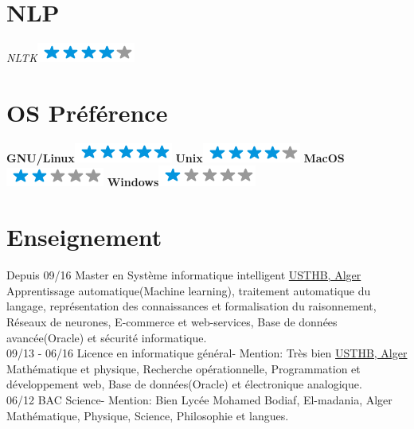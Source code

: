 \documentclass[]{friggeri-cv}
\begin{document}
\begin{aside}
  \section{NLP}
    \emph{NLTK}\includegraphics[scale=0.40]{img/4stars.png}    
    ~
    ~
  \section{OS Préférence}
    \textbf{GNU/Linux}\includegraphics[scale=0.40]{img/5stars.png}
    \textbf{Unix}\includegraphics[scale=0.40]{img/4stars.png}
    \textbf{MacOS}\includegraphics[scale=0.40]{img/2stars.png}
    \textbf{Windows}\includegraphics[scale=0.40]{img/1stars.png}
\end{aside}
\vspace{0.42cm}
\section{Enseignement}
\begin{entrylist}
  \entry
    {Depuis 09/16}
    {Master en  Système informatique intelligent}
    {\href{http://www.usthb.dz/IMG/pdf/Master-SII.pdf}{USTHB, Alger}}
    {Apprentissage automatique(Machine learning), traitement automatique du langage, représentation des connaissances et formalisation du raisonnement, Réseaux de neurones, E-commerce et web-services, Base de données avancée(Oracle) et sécurité informatique.\\}
  \entry
    {09/13 - 06/16}
    {Licence en informatique général- Mention: Très bien}
    {\href{http://www.usthb.dz/spip.php?article47}{USTHB, Alger}}
    {Mathématique et physique, Recherche opérationnelle, Programmation et développement web,  Base de données(Oracle) et électronique analogique.\\}
  \entry
    {06/12}
    {BAC Science- Mention: Bien}
    {Lycée Mohamed Bodiaf, El-madania, Alger}
    {Mathématique, Physique, Science, Philosophie et langues.}
\end{entrylist}
\end{document}
